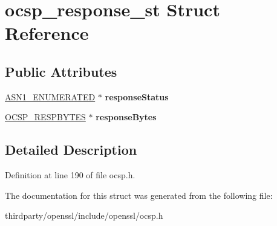 \hypertarget{structocsp__response__st}{}\section{ocsp\+\_\+response\+\_\+st Struct Reference}
\label{structocsp__response__st}
\subsection*{Public Attributes}
\begin{DoxyCompactItemize}
\item 
\mbox{\label{structocsp__response__st_a5c79d6dd4c93fb0946fc1e94467589fe}} 
\hyperlink{structasn1__string__st}{A\+S\+N1\+\_\+\+E\+N\+U\+M\+E\+R\+A\+T\+ED} $\ast$ {\bfseries response\+Status}
\item 
\mbox{\label{structocsp__response__st_a4724a80cc511a45789534e55588e5b9c}} 
\hyperlink{structocsp__resp__bytes__st}{O\+C\+S\+P\+\_\+\+R\+E\+S\+P\+B\+Y\+T\+ES} $\ast$ {\bfseries response\+Bytes}
\end{DoxyCompactItemize}


\subsection{Detailed Description}


Definition at line 190 of file ocsp.\+h.



The documentation for this struct was generated from the following file\+:\begin{DoxyCompactItemize}
\item 
thirdparty/openssl/include/openssl/ocsp.\+h\end{DoxyCompactItemize}
